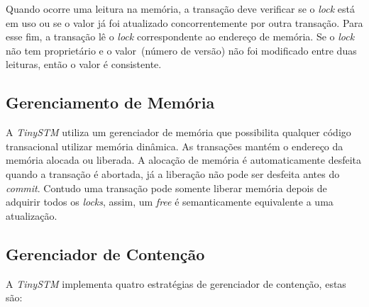 \documentclass[diss,capa]{texufpel}
\begin{document}
Quando ocorre uma leitura na memória, a transação deve verificar se o \emph{lock} está em uso ou se  o valor já foi atualizado concorrentemente por outra transação. Para esse fim, a transação lê o \emph{lock} correspondente ao endereço de memória. Se o \emph{lock} não tem proprietário e o valor~(número de versão) não foi modificado entre duas leituras, então o valor é consistente.

\subsection{Gerenciamento de Memória}

A \emph{TinySTM} utiliza um gerenciador de memória que possibilita qualquer código transacional utilizar memória dinâmica. As transações mantém o endereço da memória alocada ou liberada. A alocação de memória é automaticamente desfeita quando a transação é abortada, já a liberação não pode ser desfeita antes do \emph{commit}. Contudo uma transação pode somente liberar memória depois de adquirir todos os \emph{locks}, assim, um \emph{free} é semanticamente equivalente a uma atualização.

\subsection{Gerenciador de Contenção}

A \emph{TinySTM} implementa quatro estratégias de gerenciador de contenção, estas são:
\end{document}
